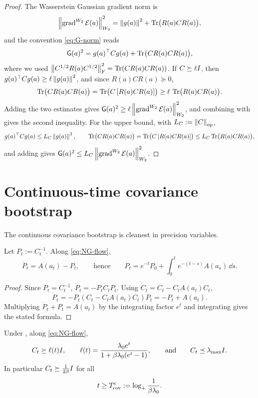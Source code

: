 \begin{proof}
The Wasserstein Gaussian gradient norm is
\[
    \left\lVert \operatorname{grad}^{W_2}\mathcal{E}(a)\right\rVert_{W_2}^2
    =
    \left\lVert g(a)\right\rVert^2+\operatorname{Tr}\bigl(R(a)CR(a)\bigr),
\]
and the convention \eqref{eq:G-norm} reads
\[
    \mathsf{G}(a)^2
    =
    g(a)^\top Cg(a)+\operatorname{Tr}\bigl(CR(a)CR(a)\bigr),
\]
where we used $\left\lVert C^{1/2}R(a)C^{1/2}\right\rVert_{\mathrm{F}}^2=\operatorname{Tr}(CR(a)CR(a))$. If $C\succeq\ell I$,
then $g(a)^\top Cg(a)\geq\ell\left\lVert g(a)\right\rVert^2$, and since $R(a)CR(a)\succeq0$,
\[
    \operatorname{Tr}\bigl(CR(a)CR(a)\bigr)
    =
    \operatorname{Tr}\bigl(C\,[R(a)CR(a)]\bigr)
    \geq
    \ell\,\operatorname{Tr}\bigl(R(a)CR(a)\bigr).
\]
Adding the two estimates gives
$\mathsf{G}(a)^2\geq\ell\left\lVert \operatorname{grad}^{W_2}\mathcal{E}(a)\right\rVert_{W_2}^2$, and combining with
 gives the second inequality. For the upper bound, with
$L_C:=\left\lVert C\right\rVert_{\mathrm{op}}$,
\[
    g(a)^\top Cg(a)\leq L_C\left\lVert g(a)\right\rVert^2,
    \qquad
    \operatorname{Tr}\bigl(CR(a)CR(a)\bigr)=\operatorname{Tr}\bigl(C\,[R(a)CR(a)]\bigr)\leq L_C\operatorname{Tr}\bigl(R(a)CR(a)\bigr),
\]
and adding gives $\mathsf{G}(a)^2\leq L_C\left\lVert \operatorname{grad}^{W_2}\mathcal{E}(a)\right\rVert_{W_2}^2$.
\end{proof}

\section{Continuous-time covariance bootstrap}

The continuous covariance bootstrap is cleanest in precision variables.

\begin{lemma}
\label{lem:precision-duhamel}
Let $P_t:=C_t^{-1}$. Along \eqref{eq:NG-flow},
\[
    \dot P_t=A(a_t)-P_t,
    \qquad\text{hence}\qquad
    P_t
    =
    e^{-t}P_0
    +
    \int_0^t e^{-(t-s)}A(a_s)\,\dd s.
\]
\end{lemma}

\begin{proof}
Since $P_t=C_t^{-1}$, $\dot P_t=-P_t\dot C_tP_t$. Using $\dot C_t=C_t-C_tA(a_t)C_t$,
\[
    \dot P_t
    =
    -P_t(C_t-C_tA(a_t)C_t)P_t
    =
    -P_t+A(a_t).
\]
Multiplying $\dot P_t+P_t=A(a_t)$ by the integrating factor $e^t$ and integrating gives
the stated formula.
\end{proof}

\begin{lemma}
\label{lem:cont-cov}
Under , along \eqref{eq:NG-flow},
\[
    C_t\succeq \ell(t)I,
    \qquad
    \ell(t)
    =
    \frac{\lambda_0e^t}{1+\beta\lambda_0(e^t-1)},
    \qquad\text{and}\qquad
    C_t\preceq\lambda_{\max}I .
\]
In particular $C_t\succeq\tfrac1{2\beta}I$ for all
\[
    t\geq T_{\mathrm{cov}}^{\mathrm c}
    :=
    \log_+\frac1{\beta\lambda_0}.
\]
\end{lemma}

